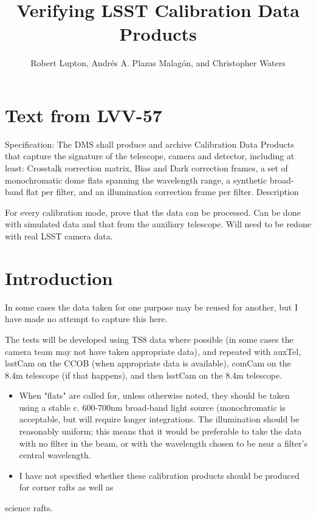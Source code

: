 \documentclass[DM,authoryear,toc,lsstdraft]{lsstdoc}
\title{Verifying LSST Calibration Data Products}
\author{%
Robert Lupton,
Andrés A. Plazas Malagón,
and
Christopher Waters
}
\date{\vcsDate}
\begin{document}

\maketitle

\renewcommand{\secRef}[1]{Sec. \ref{#1}}
\section{Text from LVV-57}
Specification: The DMS shall produce and archive Calibration Data Products that capture the signature of the
telescope, camera and detector, including at least: Crosstalk correction matrix, Bias and Dark correction
frames, a set of monochromatic dome flats spanning the wavelength range, a synthetic broad-band flat per
filter, and an illumination correction frame per filter.  Description

For every calibration mode, prove that the data can be processed. Can be done with simulated data and that
from the auxiliary telescope. Will need to be redone with real LSST camera data.

\section{Introduction}

In some cases the data taken for one purpose may be reused for another, but I have made no attempt to
capture this here.

The tests will be developed using TS8 data where possible (in some cases the camera team may not have taken
appropriate data), and repeated with auxTel, lsstCam on the CCOB (when appropriate data is available), comCam
on the 8.4m telescope (if that happens), and then lsstCam on the 8.4m telescope.

\begin{itemize}
\item When "flats" are called for, unless otherwise noted, they should be taken using a stable c. 600-700nm
broad-band light source (monochromatic is acceptable, but will require longer integrations. The illumination
should be reasonably uniform; this means that it would be preferable to take the data with no filter in the
beam, or with the wavelength chosen to be near a filter's central wavelength.

\item I have not specified whether these calibration products should be produced for corner rafts as well as
\end{itemize}
science rafts.
\end{document}
